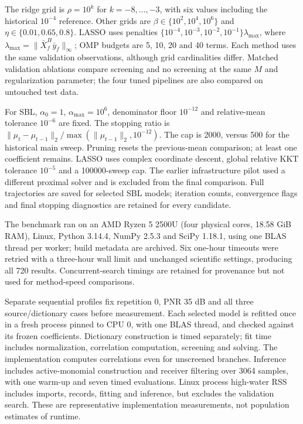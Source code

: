 \documentclass[conference]{IEEEtran}
\begin{document}
The ridge grid is $\rho=10^k$ for $k=-8,\ldots,-3$, with six values including the historical $10^{-4}$ reference. Other grids are $\beta\in\{10^2,10^4,10^6\}$ and $\eta\in\{0.01,0.65,0.8\}$. LASSO uses penalties $\{10^{-4},10^{-3},10^{-2},10^{-1}\}\lambda_{\max}$, where $\lambda_{\max}=\|\bar X_f^H\bar y_f\|_\infty$; OMP budgets are 5, 10, 20 and 40 terms. Each method uses the same validation observations, although grid cardinalities differ. Matched validation ablations compare screening and no screening at the same $M$ and regularization parameter; the four tuned pipelines are also compared on untouched test data.

For SBL, $\alpha_0=1$, $\alpha_{\max}=10^6$, denominator floor $10^{-12}$ and relative-mean tolerance $10^{-6}$ are fixed. The stopping ratio is $\|\mu_t-\mu_{t-1}\|_2/\max(\|\mu_{t-1}\|_2,10^{-12})$. The cap is 2000, versus 500 for the historical main sweep. Pruning resets the previous-mean comparison; at least one coefficient remains. LASSO uses complex coordinate descent, global relative KKT tolerance $10^{-5}$ and a 100000-sweep cap. The earlier infrastructure pilot used a different proximal solver and is excluded from the final comparison. Full trajectories are saved for selected SBL models; iteration counts, convergence flags and final stopping diagnostics are retained for every candidate.

The benchmark ran on an AMD Ryzen 5 2500U (four physical cores, 18.58 GiB RAM), Linux, Python 3.14.4, NumPy 2.5.3 and SciPy 1.18.1, using one BLAS thread per worker; build metadata are archived. Six one-hour timeouts were retried with a three-hour wall limit and unchanged scientific settings, producing all 720 results. Concurrent-search timings are retained for provenance but not used for method-speed comparisons.

Separate sequential profiles fix repetition 0, PNR 35 dB and all three source/dictionary cases before measurement. Each selected model is refitted once in a fresh process pinned to CPU 0, with one BLAS thread, and checked against its frozen coefficients. Dictionary construction is timed separately; fit time includes normalization, correlation computation, screening and solving. The implementation computes correlations even for unscreened branches. Inference includes active-monomial construction and receiver filtering over 3064 samples, with one warm-up and seven timed evaluations. Linux process high-water RSS includes imports, records, fitting and inference, but excludes the validation search. These are representative implementation measurements, not population estimates of runtime.
\end{document}
